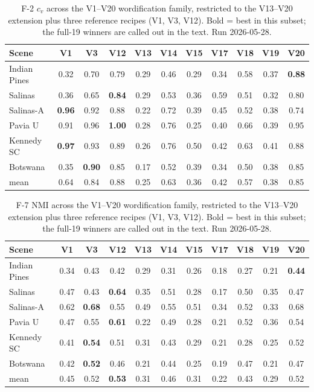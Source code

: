 \documentclass[journal,a4paper,10pt]{IEEEtran}
\begin{document}
\begin{table}[ht]
\caption{F-2 $c_v$ across the V1--V20 wordification family, restricted
to the V13--V20 extension plus three reference recipes
(V1, V3, V12). Bold = best in this subset; the full-19 winners are
called out in the text. Run 2026-05-28.}
\label{tab:f2-extension}
\centering
\small
\begin{tabular}{lcccccccccc}
\toprule
Scene & V1 & V3 & V12 & V13 & V14 & V15 & V17 & V18 & V19 & V20 \\
\midrule
Indian Pines     & 0.32 & 0.70 & 0.79 & 0.29 & 0.46 & 0.29 & 0.34 & 0.58 & 0.37 & \textbf{0.88} \\
Salinas          & 0.36 & 0.65 & \textbf{0.84} & 0.29 & 0.53 & 0.36 & 0.59 & 0.51 & 0.32 & 0.80 \\
Salinas-A        & \textbf{0.96} & 0.92 & 0.88 & 0.22 & 0.72 & 0.39 & 0.45 & 0.52 & 0.38 & 0.74 \\
Pavia U          & 0.91 & 0.96 & \textbf{1.00} & 0.28 & 0.76 & 0.25 & 0.40 & 0.66 & 0.39 & 0.95 \\
Kennedy SC       & \textbf{0.97} & 0.93 & 0.89 & 0.26 & 0.76 & 0.50 & 0.42 & 0.63 & 0.41 & 0.88 \\
Botswana         & 0.35 & \textbf{0.90} & 0.85 & 0.17 & 0.52 & 0.39 & 0.34 & 0.50 & 0.38 & 0.85 \\
\midrule
mean             & 0.64 & 0.84 & 0.88 & 0.25 & 0.63 & 0.36 & 0.42 & 0.57 & 0.38 & 0.85 \\
\bottomrule
\end{tabular}
\end{table}

\begin{table}[ht]
\caption{F-7 NMI across the V1--V20 wordification family, restricted
to the V13--V20 extension plus three reference recipes
(V1, V3, V12). Bold = best in this subset; the full-19 winners are
called out in the text. Run 2026-05-28.}
\label{tab:f7-extension}
\centering
\small
\begin{tabular}{lcccccccccc}
\toprule
Scene & V1 & V3 & V12 & V13 & V14 & V15 & V17 & V18 & V19 & V20 \\
\midrule
Indian Pines     & 0.34 & 0.43 & 0.42 & 0.29 & 0.31 & 0.26 & 0.18 & 0.27 & 0.21 & \textbf{0.44} \\
Salinas          & 0.47 & 0.43 & \textbf{0.64} & 0.35 & 0.51 & 0.28 & 0.17 & 0.50 & 0.35 & 0.47 \\
Salinas-A        & 0.62 & \textbf{0.68} & 0.55 & 0.49 & 0.55 & 0.51 & 0.34 & 0.52 & 0.33 & 0.68 \\
Pavia U          & 0.47 & 0.55 & \textbf{0.61} & 0.22 & 0.49 & 0.28 & 0.21 & 0.52 & 0.36 & 0.54 \\
Kennedy SC       & 0.41 & \textbf{0.54} & 0.51 & 0.31 & 0.43 & 0.29 & 0.21 & 0.28 & 0.25 & 0.52 \\
Botswana         & 0.42 & \textbf{0.52} & 0.46 & 0.21 & 0.44 & 0.25 & 0.19 & 0.47 & 0.21 & 0.47 \\
\midrule
mean             & 0.45 & 0.52 & \textbf{0.53} & 0.31 & 0.46 & 0.31 & 0.22 & 0.43 & 0.29 & 0.52 \\
\bottomrule
\end{tabular}
\end{table}
\end{document}
